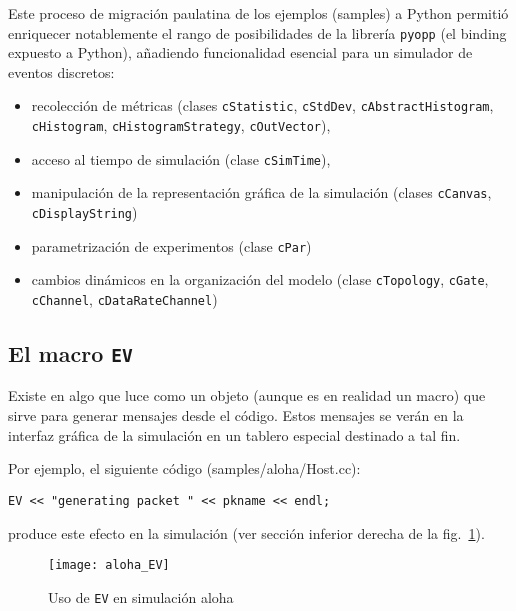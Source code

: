 Este proceso de migración paulatina de los ejemplos (samples) a Python permitió
enriquecer notablemente el rango de posibilidades de la librería \verb!pyopp!
(el binding expuesto a Python), añadiendo funcionalidad esencial para un
simulador de eventos discretos:

\begin{itemize}
    \item recolección de métricas (clases \verb!cStatistic!, \verb!cStdDev!,
    \verb!cAbstractHistogram!, \linebreak \verb!cHistogram!,
    \verb!cHistogramStrategy!, \verb!cOutVector!),

    \item acceso al tiempo de simulación (clase \verb!cSimTime!),

    \item manipulación de la representación gráfica de la simulación (clases
    \verb!cCanvas!, \linebreak \verb!cDisplayString!)

    \item parametrización de experimentos (clase \verb!cPar!)

    \item cambios dinámicos en la organización del modelo (clase
\verb!cTopology!, \verb!cGate!, \verb!cChannel!, \verb!cDataRateChannel!)
\end{itemize}

\subsection{El macro \texttt{EV}}\label{subsec:ev}

Existe en \omnetpp{} algo que luce como un objeto (aunque es en realidad un macro)
que sirve para generar mensajes desde el código. Estos mensajes se verán en la
interfaz gráfica de la simulación en un tablero especial destinado a tal fin.

Por ejemplo, el siguiente código (samples/aloha/Host.cc):

\begin{verbatim}
EV << "generating packet " << pkname << endl;
\end{verbatim}

\noindent produce este efecto en la simulación (ver sección inferior derecha de
la fig.~\ref{fig:aloha_EV}).

\begin{figure}[h]
\caption{Uso de \texttt{EV} en simulación aloha}
\label{fig:aloha_EV}
\centering
\texttt{[image: aloha\_EV]}
\end{figure}

